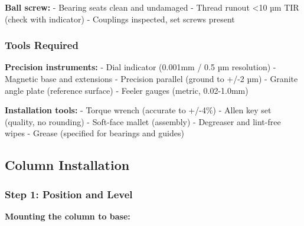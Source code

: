 \documentclass[
]{article}
\begin{document}
\textbf{Ball screw:} - Bearing seats clean and undamaged - Thread runout
\textless10 µm TIR (check with indicator) - Couplings inspected, set
screws present

\subsubsection{Tools Required}\label{tools-required}

\textbf{Precision instruments:} - Dial indicator (0.001mm / 0.5 µm
resolution) - Magnetic base and extensions - Precision parallel (ground
to +/-2 µm) - Granite angle plate (reference surface) - Feeler gauges
(metric, 0.02-1.0mm)

\textbf{Installation tools:} - Torque wrench (accurate to +/-4\%) -
Allen key set (quality, no rounding) - Soft-face mallet (assembly) -
Degreaser and lint-free wipes - Grease (specified for bearings and
guides)

\subsection{Column Installation}\label{column-installation}

\subsubsection{Step 1: Position and
Level}\label{step-1-position-and-level}

\textbf{Mounting the column to base:}
\end{document}

